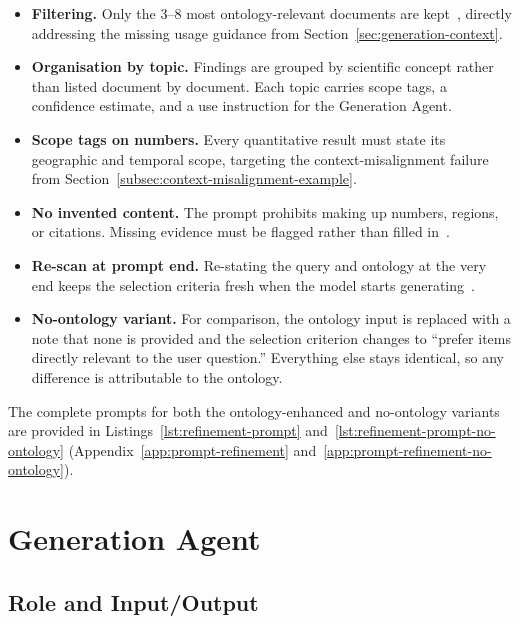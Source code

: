 \begin{itemize}
\item \textbf{Filtering.} Only the 3--8 most ontology-relevant documents are kept~\citep{wang2024filco}, directly addressing the missing usage guidance from Section~\ref{sec:generation-context}.
\item \textbf{Organisation by topic.} Findings are grouped by scientific concept rather than listed document by document. Each topic carries scope tags, a confidence estimate, and a use instruction for the Generation Agent.
\item \textbf{Scope tags on numbers.} Every quantitative result must state its geographic and temporal scope, targeting the context-misalignment failure from Section~\ref{subsec:context-misalignment-example}.
\item \textbf{No invented content.} The prompt prohibits making up numbers, regions, or citations. Missing evidence must be flagged rather than filled in~\citep{bechard2024reducing}.
\item \textbf{Re-scan at prompt end.} Re-stating the query and ontology at the very end keeps the selection criteria fresh when the model starts generating~\citep{liu2024lost}.
\item \textbf{No-ontology variant.} For comparison, the ontology input is replaced with a note that none is provided and the selection criterion changes to ``prefer items directly relevant to the user question.'' Everything else stays identical, so any difference is attributable to the ontology.
\end{itemize}

The complete prompts for both the ontology-enhanced and no-ontology variants are provided in Listings~\ref{lst:refinement-prompt} and~\ref{lst:refinement-prompt-no-ontology} (Appendix~\ref{app:prompt-refinement} and~\ref{app:prompt-refinement-no-ontology}).

\section{Generation Agent}
\label{sec:generation-agent}

\subsection{Role and Input/Output}
\label{subsec:generation-role}


